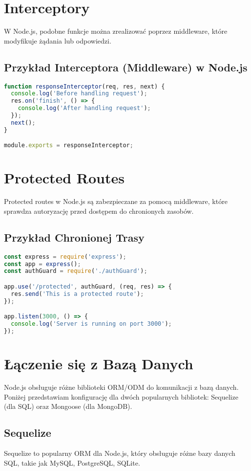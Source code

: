 \documentclass[a4paper,12pt]{article}
\begin{document}
\section{Interceptory}
W Node.js, podobne funkcje można zrealizować poprzez middleware, które modyfikuje żądania lub odpowiedzi.

\subsection{Przykład Interceptora (Middleware) w Node.js}
\begin{lstlisting}[language=JavaScript, caption=Przykład interceptora w Node.js]
function responseInterceptor(req, res, next) {
  console.log('Before handling request');
  res.on('finish', () => {
    console.log('After handling request');
  });
  next();
}

module.exports = responseInterceptor;
\end{lstlisting}

\section{Protected Routes}
Protected routes w Node.js są zabezpieczane za pomocą middleware, które sprawdza autoryzację przed dostępem do chronionych zasobów.

\subsection{Przykład Chronionej Trasy}
\begin{lstlisting}[language=JavaScript, caption=Przykład chronionej trasy w Node.js]
const express = require('express');
const app = express();
const authGuard = require('./authGuard');

app.use('/protected', authGuard, (req, res) => {
  res.send('This is a protected route');
});

app.listen(3000, () => {
  console.log('Server is running on port 3000');
});
\end{lstlisting}

\section{Łączenie się z Bazą Danych}
Node.js obsługuje różne biblioteki ORM/ODM do komunikacji z bazą danych. Poniżej przedstawiam konfigurację dla dwóch popularnych bibliotek: Sequelize (dla SQL) oraz Mongoose (dla MongoDB).

\subsection{Sequelize}
Sequelize to popularny ORM dla Node.js, który obsługuje różne bazy danych SQL, takie jak MySQL, PostgreSQL, SQLite.
\end{document}
